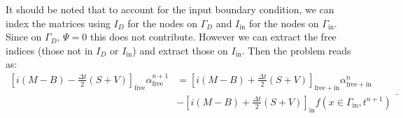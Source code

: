 \documentclass[../../main.tex]{subfiles}
\begin{document}
It should be noted that to account for the input boundary condition,
we can index the matrices using 
$I_D$ for the nodes on $\Gamma_D$ and 
$I_\mathrm{in}$ for the nodes on $\Gamma_\mathrm{in}$.
Since on $\Gamma_D$, $\Psi = 0$ this does not contribute.  
However we can extract the free indices (those not in $I_D$ or $I_\mathrm{in}$)
and extract those on $I_\mathrm{in}$.  
Then the problem reads as:
\[
  \begin{split}
		  \left[i (M - B) - \frac{\Delta t}{2} (S + V)\right]_\mathrm{free} 
		  \alpha^{n+1}_\mathrm{free}
		  & = \left[i(M - B) + \frac{\Delta t}{2} (S + V)\right]_\mathrm{
		  free + in} \alpha^n_\mathrm{free + in} \\
		  & - \left[i(M - B) + \frac{\Delta t}{2} (S + V)\right]_\mathrm{in} 
		  f\left(x\in \Gamma_\mathrm{in}, t^{n+1}\right)
  \end{split}
.\] 
\end{document}
